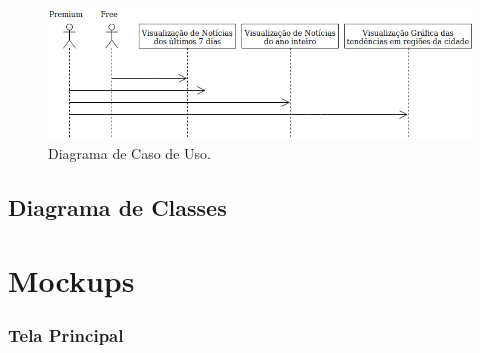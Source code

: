 \documentclass[
	12pt,				%
	openright,			%
	twoside,			%
	a4paper,			%
	english,			%
	french,				%
	spanish,			%
	brazil,				%
	]{abntex2}
\begin{document}
\begin{figure}[h]
	\caption{\label{caso_de_uso_figura}Diagrama de Caso de Uso.}
	\begin{center}
		\includegraphics[scale=0.68]{figuras/diagrama-de-caso-de-uso.png}
	\end{center}
\end{figure}

\section{Diagrama de Classes}




\chapter{Mockups}

\subsection{Tela Principal}
\end{document}
